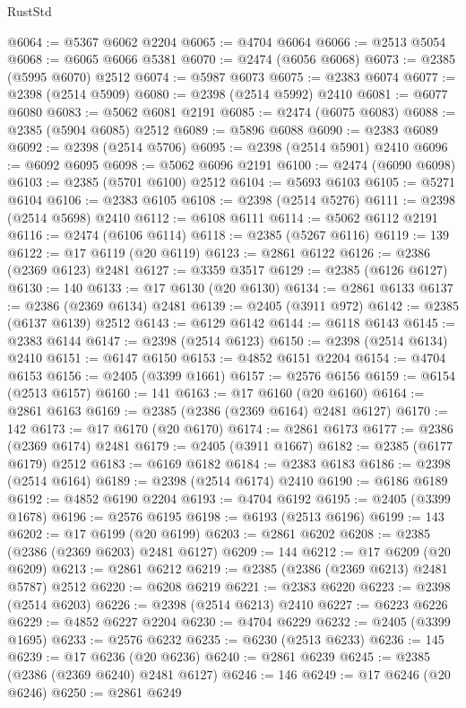 \begin{lexlean}{RustStd}
\begin{coremodule}
@6064 := @5367 @6062 @2204
@6065 := @4704 @6064
@6066 := @2513 @5054
@6068 := @6065 @6066 @5381
@6070 := @2474 (@6056 @6068)
@6073 := @2385 (@5995 @6070) @2512
@6074 := @5987 @6073
@6075 := @2383 @6074
@6077 := @2398 (@2514 @5909)
@6080 := @2398 (@2514 @5992) @2410
@6081 := @6077 @6080
@6083 := @5062 @6081 @2191
@6085 := @2474 (@6075 @6083)
@6088 := @2385 (@5904 @6085) @2512
@6089 := @5896 @6088
@6090 := @2383 @6089
@6092 := @2398 (@2514 @5706)
@6095 := @2398 (@2514 @5901) @2410
@6096 := @6092 @6095
@6098 := @5062 @6096 @2191
@6100 := @2474 (@6090 @6098)
@6103 := @2385 (@5701 @6100) @2512
@6104 := @5693 @6103
@6105 := @5271 @6104
@6106 := @2383 @6105
@6108 := @2398 (@2514 @5276)
@6111 := @2398 (@2514 @5698) @2410
@6112 := @6108 @6111
@6114 := @5062 @6112 @2191
@6116 := @2474 (@6106 @6114)
@6118 := @2385 (@5267 @6116)
@6119 := 139
@6122 := @17 @6119 (@20 @6119)
@6123 := @2861 @6122
@6126 := @2386 (@2369 @6123) @2481
@6127 := @3359 @3517
@6129 := @2385 (@6126 @6127)
@6130 := 140
@6133 := @17 @6130 (@20 @6130)
@6134 := @2861 @6133
@6137 := @2386 (@2369 @6134) @2481
@6139 := @2405 (@3911 @972)
@6142 := @2385 (@6137 @6139) @2512
@6143 := @6129 @6142
@6144 := @6118 @6143
@6145 := @2383 @6144
@6147 := @2398 (@2514 @6123)
@6150 := @2398 (@2514 @6134) @2410
@6151 := @6147 @6150
@6153 := @4852 @6151 @2204
@6154 := @4704 @6153
@6156 := @2405 (@3399 @1661)
@6157 := @2576 @6156
@6159 := @6154 (@2513 @6157)
@6160 := 141
@6163 := @17 @6160 (@20 @6160)
@6164 := @2861 @6163
@6169 := @2385 (@2386 (@2369 @6164) @2481 @6127)
@6170 := 142
@6173 := @17 @6170 (@20 @6170)
@6174 := @2861 @6173
@6177 := @2386 (@2369 @6174) @2481
@6179 := @2405 (@3911 @1667)
@6182 := @2385 (@6177 @6179) @2512
@6183 := @6169 @6182
@6184 := @2383 @6183
@6186 := @2398 (@2514 @6164)
@6189 := @2398 (@2514 @6174) @2410
@6190 := @6186 @6189
@6192 := @4852 @6190 @2204
@6193 := @4704 @6192
@6195 := @2405 (@3399 @1678)
@6196 := @2576 @6195
@6198 := @6193 (@2513 @6196)
@6199 := 143
@6202 := @17 @6199 (@20 @6199)
@6203 := @2861 @6202
@6208 := @2385 (@2386 (@2369 @6203) @2481 @6127)
@6209 := 144
@6212 := @17 @6209 (@20 @6209)
@6213 := @2861 @6212
@6219 := @2385 (@2386 (@2369 @6213) @2481 @5787) @2512
@6220 := @6208 @6219
@6221 := @2383 @6220
@6223 := @2398 (@2514 @6203)
@6226 := @2398 (@2514 @6213) @2410
@6227 := @6223 @6226
@6229 := @4852 @6227 @2204
@6230 := @4704 @6229
@6232 := @2405 (@3399 @1695)
@6233 := @2576 @6232
@6235 := @6230 (@2513 @6233)
@6236 := 145
@6239 := @17 @6236 (@20 @6236)
@6240 := @2861 @6239
@6245 := @2385 (@2386 (@2369 @6240) @2481 @6127)
@6246 := 146
@6249 := @17 @6246 (@20 @6246)
@6250 := @2861 @6249

\end{coremodule}
\end{lexlean}
